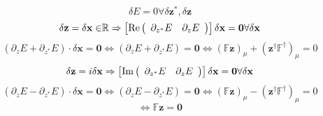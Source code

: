 \documentclass[aps,preprint]{revtex4}%
\begin{document}
\begin{equation}
\delta E=0\forall\delta\mathbf{z}^{\ast},\delta\mathbf{z}%
\end{equation}%
\begin{equation}
\delta\mathbf{z}=\delta\mathbf{x\in}\mathbb{R}\Rightarrow\left[
\operatorname{Re}\left(
\begin{array}
[c]{cc}%
\partial_{z^{\ast}}E & \partial_{z}E
\end{array}
\right)  \right]  \delta\mathbf{x=0}\forall\delta\mathbf{x}%
\end{equation}%
\begin{equation}
\left(  \partial_{z}E+\partial_{z^{\ast}}E\right)  \cdot\delta\mathbf{x=0}%
\Leftrightarrow\left(  \partial_{z}E+\partial_{z^{\ast}}E\right)
=\mathbf{0}\Leftrightarrow\left(  \mathbb{F}\mathbf{z}\right)  _{\mu}+\left(
\mathbf{z}^{\dagger}\mathbb{F}^{\dagger}\right)  _{\mu}=0
\end{equation}%
\begin{equation}
\delta\mathbf{z}=i\delta\mathbf{x}\Rightarrow\left[  \operatorname{Im}\left(
\begin{array}
[c]{cc}%
\partial_{z^{\ast}}E & \partial_{z}E
\end{array}
\right)  \right]  \delta\mathbf{x=0}\forall\delta\mathbf{x}%
\end{equation}%
\begin{equation}
\left(  \partial_{z}E-\partial_{z^{\ast}}E\right)  \cdot\delta\mathbf{x=0}%
\Leftrightarrow\left(  \partial_{z}E-\partial_{z^{\ast}}E\right)
=\mathbf{0}\Leftrightarrow\left(  \mathbb{F}\mathbf{z}\right)  _{\mu}-\left(
\mathbf{z}^{\dagger}\mathbb{F}^{\dagger}\right)  _{\mu}=0
\end{equation}%
\begin{equation}
\Leftrightarrow\mathbb{F}\mathbf{z=0}%
\end{equation}
\end{document}
